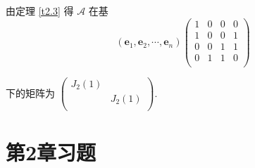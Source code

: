 \documentclass[color=black,device=normal,lang=cn,mode=geye]{elegantnote}
\begin{document}
\begin{solution}
    由定理 \ref{t2.3} 得 $\mathcal{A}$ 在基
    \[(\boldsymbol{e}_1,\boldsymbol{e}_2,\cdots,\boldsymbol{e}_n)\begin{pmatrix}
        1 & 0 & 0 & 0 \\
        1 & 0 & 0 & 1 \\
        0 & 0 & 1 & 1 \\
        0 & 1 & 1 & 0 \\
    \end{pmatrix}\]

    下的矩阵为 $\begin{pmatrix}
        J_2(1) \\
        & J_2(1) \\
    \end{pmatrix}$.
\end{solution}
\section{第2章习题}
\end{document}
